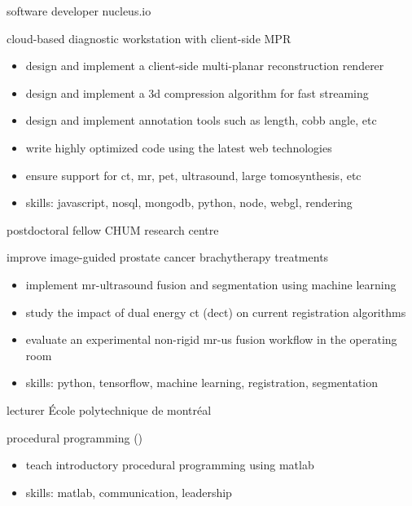 \documentclass[print]{friggeri-cv}
\begin{document}
\begin{entrylist}
  {software developer} {nucleus.io}
  {cloud-based diagnostic workstation with client-side {\small MPR}
  \begin{itemize}
    \item design and implement a client-side multi-planar reconstruction renderer
    \item design and implement a 3d compression algorithm for fast streaming
    \item design and implement annotation tools such as length, cobb angle, etc
    \item write highly optimized code using the latest web technologies
    \item ensure support for ct, mr, pet, ultrasound, large tomosynthesis, etc
    \item skills: javascript, nosql, mongodb, python, node, webgl, rendering
  \end{itemize}}

  {postdoctoral fellow}
  {CHUM research centre}
  {improve image-guided prostate cancer brachytherapy treatments
  \begin{itemize}
    \item implement mr-ultrasound fusion and segmentation using machine learning
    \item study the impact of dual energy ct (dect) on current registration algorithms
    \item evaluate an experimental non-rigid mr-us fusion workflow in the operating room
    \item skills: python, tensorflow, machine learning, registration, segmentation
  \end{itemize}}

  {lecturer}
  {École polytechnique de montréal}
  {procedural programming (\infmat)
  \begin{itemize}
    \item teach introductory procedural programming using matlab
    \item skills: matlab, communication, leadership
  \end{itemize}}

\end{entrylist}

\clearpage
\end{document}
